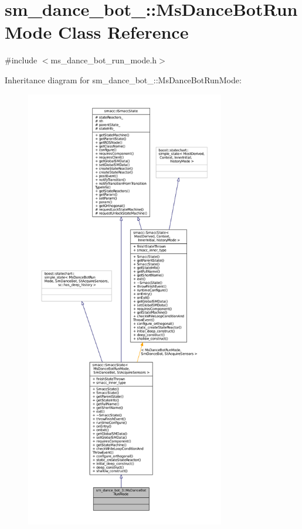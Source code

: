 \hypertarget{classsm__dance__bot__3_1_1MsDanceBotRunMode}{}\section{sm\+\_\+dance\+\_\+bot\+\_\+:\+:Ms\+Dance\+Bot\+Run\+Mode Class Reference}
\label{classsm__dance__bot__3_1_1MsDanceBotRunMode}


{\ttfamily \#include $<$ms\+\_\+dance\+\_\+bot\+\_\+run\+\_\+mode.\+h$>$}



Inheritance diagram for sm\+\_\+dance\+\_\+bot\+\_\+:\+:Ms\+Dance\+Bot\+Run\+Mode\+:
\nopagebreak
\begin{figure}[H]
\begin{center}
\leavevmode
\includegraphics[height=550pt]{classsm__dance__bot__3_1_1MsDanceBotRunMode__inherit__graph}
\end{center}
\end{figure}


